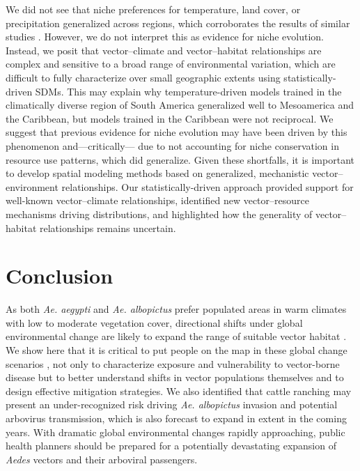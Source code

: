We did not see that niche preferences for temperature, land cover, or precipitation generalized across regions, which corroborates the results of similar studies \cite{Medley2010-fa, Pech-May2016-vs, Carlson2016-rc}. However, we do not interpret this as evidence for niche evolution. Instead, we posit that vector–climate and vector–habitat relationships are complex and sensitive to a broad range of environmental variation, which are difficult to fully characterize over small geographic extents using statistically-driven SDMs. This may explain why temperature-driven models trained in the climatically diverse region of South America generalized well to Mesoamerica and the Caribbean, but models trained in the Caribbean were not reciprocal. We suggest that previous evidence for niche evolution may have been driven by this phenomenon and—critically— due to not accounting for niche conservation in resource use patterns, which did generalize. Given these shortfalls, it is important to develop spatial modeling methods based on generalized, mechanistic vector–environment relationships. Our statistically-driven approach provided support for well-known vector–climate relationships, identified new vector–resource mechanisms driving distributions, and highlighted how the generality of vector–habitat relationships remains uncertain.

\section{Conclusion}

As both \textit{Ae. aegypti} and \textit{Ae. albopictus} prefer populated areas in warm climates with low to moderate vegetation cover, directional shifts under global environmental change are likely to expand the range of suitable vector habitat \cite{Ryan2019-pz}. We show here that it is critical to put people on the map in these global change scenarios \cite{Ellis2008-xj}, not only to characterize exposure and vulnerability to vector-borne disease but to better understand shifts in vector populations themselves and to design effective mitigation strategies. We also identified that cattle ranching may present an under-recognized risk driving \textit{Ae. albopictus} invasion and potential arbovirus transmission, which is also forecast to expand in extent in the coming years. With dramatic global environmental changes rapidly approaching, public health planners should be prepared for a potentially devastating expansion of \textit{Aedes} vectors and their arboviral passengers.

\clearpage